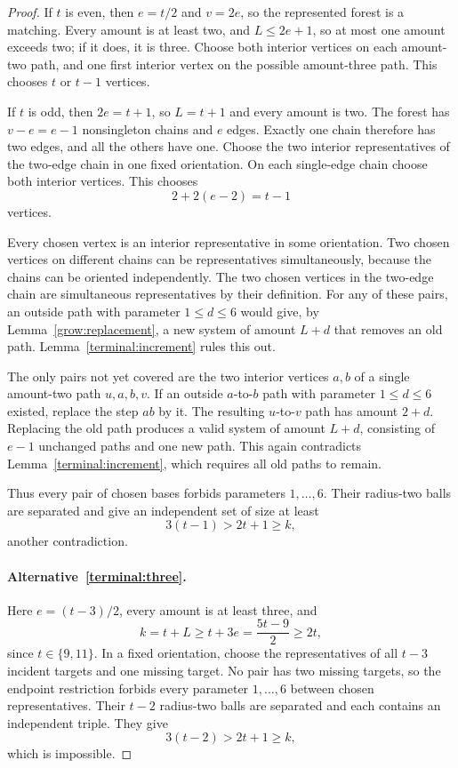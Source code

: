 \begin{proof}
If \(t\) is even, then \(e=t/2\) and \(v=2e\), so the represented forest is
a matching.  Every amount is at least two, and \(L\le2e+1\), so at most one
amount exceeds two; if it does, it is three.
Choose both interior vertices on each amount-two path, and one first
interior vertex on the possible amount-three path.
This chooses \(t\) or \(t-1\) vertices.

If \(t\) is odd, then \(2e=t+1\), so \(L=t+1\) and every amount is two.
The forest has \(v-e=e-1\) nonsingleton chains and \(e\) edges.
Exactly one chain therefore has two edges, and all the others have one.
Choose the two interior representatives of the two-edge chain in one
fixed orientation.  On each single-edge chain choose both interior
vertices.  This chooses
\[
 2+2(e-2)=t-1
\]
vertices.

Every chosen vertex is an interior representative in some orientation.
Two chosen vertices on different chains can be representatives
simultaneously, because the chains can be oriented independently.
The two chosen vertices in the two-edge chain are simultaneous
representatives by their definition.  For any of these pairs, an outside
path with parameter \(1\le d\le6\) would give, by
Lemma~\ref{grow:replacement}, a new system of amount \(L+d\) that removes
an old path.  Lemma~\ref{terminal:increment} rules this out.

The only pairs not yet covered are the two interior vertices \(a,b\) of a
single amount-two path \(u,a,b,v\).
If an outside \(a\)-to-\(b\) path with parameter \(1\le d\le6\) existed,
replace the step \(ab\) by it.  The resulting \(u\)-to-\(v\) path has
amount \(2+d\).  Replacing the old path produces a valid system of amount
\(L+d\), consisting of \(e-1\) unchanged paths and one new path.
This again contradicts Lemma~\ref{terminal:increment}, which requires all
old paths to remain.

Thus every pair of chosen bases forbids parameters \(1,\ldots,6\).
Their radius-two balls are separated and give an independent set of size
at least
\[
 3(t-1)>2t+1\ge k,
\]
another contradiction.

\paragraph{Alternative~\ref{terminal:three}.}
Here \(e=(t-3)/2\), every amount is at least three, and
\[
 k=t+L\ge t+3e=\frac{5t-9}{2}\ge2t,
\]
since \(t\in\{9,11\}\).
In a fixed orientation, choose the representatives of all \(t-3\)
incident targets and one missing target.
No pair has two missing targets, so the endpoint restriction forbids
every parameter \(1,\ldots,6\) between chosen representatives.
Their \(t-2\) radius-two balls are separated and each contains an
independent triple.  They give
\[
 3(t-2)>2t+1\ge k,
\]
which is impossible.


\end{proof}
